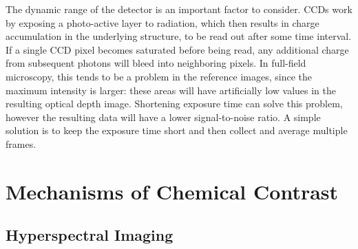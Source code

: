 \documentclass[journal=cmatex,manuscript=perspective]{achemso}
\providecommand{\DIFdelend}{} %
\begin{document}
\DIFdelend The dynamic range of the detector is an important factor to
consider. CCDs work by exposing a photo-active layer to radiation,
which then results in charge accumulation in the underlying structure,
to be read out after some time interval. If a single CCD pixel becomes
saturated before being read, any additional charge from subsequent
photons will bleed into neighboring pixels. In full-field microscopy,
this tends to be a problem in the reference images, since the maximum
intensity is larger: these areas will have artificially low values in
the resulting optical depth image. Shortening exposure time can solve
this problem, however the resulting data will have a lower
signal-to-noise ratio. A simple solution is to keep the exposure time
short and then collect and average multiple frames.

\section{Mechanisms of Chemical Contrast}

\subsection{Hyperspectral Imaging}
\end{document}
